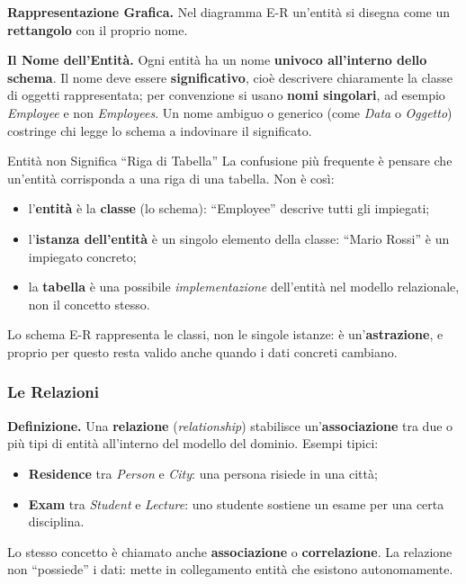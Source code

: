 \documentclass[12pt]{extarticle}
\begin{document}
\medskip
\noindent \textbf{Rappresentazione Grafica.} Nel diagramma E-R un'entità si disegna come un \textbf{rettangolo} con il proprio nome.

\begin{center}
\end{center}

\medskip
\noindent \textbf{Il Nome dell'Entità.} Ogni entità ha un nome \textbf{univoco all'interno dello schema}. Il nome deve essere \textbf{significativo}, cioè descrivere chiaramente la classe di oggetti rappresentata; per convenzione si usano \textbf{nomi singolari}, ad esempio \textit{Employee} e non \textit{Employees}. Un nome ambiguo o generico (come \textit{Data} o \textit{Oggetto}) costringe chi legge lo schema a indovinare il significato.

\begin{cbox}{Entità non Significa ``Riga di Tabella''}
\noindent La confusione più frequente è pensare che un'entità corrisponda a una riga di una tabella. Non è così:
\begin{itemize}
    \item l'\textbf{entità} è la \textbf{classe} (lo schema): ``Employee'' descrive tutti gli impiegati;
    \item l'\textbf{istanza dell'entità} è un singolo elemento della classe: ``Mario Rossi'' è un impiegato concreto;
    \item la \textbf{tabella} è una possibile \textit{implementazione} dell'entità nel modello relazionale, non il concetto stesso.
\end{itemize}
Lo schema E-R rappresenta le classi, non le singole istanze: è un'\textbf{astrazione}, e proprio per questo resta valido anche quando i dati concreti cambiano.
\end{cbox}

\subsubsection{Le Relazioni}

\noindent \textbf{Definizione.} Una \textbf{relazione} (\textit{relationship}) stabilisce un'\textbf{associazione} tra due o più tipi di entità all'interno del modello del dominio. Esempi tipici:
\begin{itemize}
    \item \textbf{Residence} tra \textit{Person} e \textit{City}: una persona risiede in una città;
    \item \textbf{Exam} tra \textit{Student} e \textit{Lecture}: uno studente sostiene un esame per una certa disciplina.
\end{itemize}
Lo stesso concetto è chiamato anche \textbf{associazione} o \textbf{correlazione}. La relazione non ``possiede'' i dati: mette in collegamento entità che esistono autonomamente.
\end{document}
